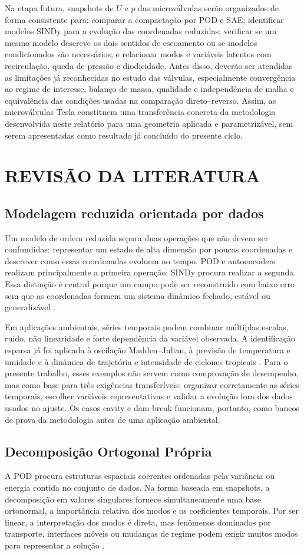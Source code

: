 \documentclass[12pt,a4paper]{article}
\newcommand{\novasecao}[1]{\clearpage\section{#1}}
\begin{document}
Na etapa futura, snapshots de $U$ e $p$ das microválvulas serão organizados de forma consistente para: comparar a compactação por POD e SAE; identificar modelos SINDy para a evolução das coordenadas reduzidas; verificar se um mesmo modelo descreve os dois sentidos de escoamento ou se modelos condicionados são necessários; e relacionar modos e variáveis latentes com recirculação, queda de pressão e diodicidade. Antes disso, deverão ser atendidas as limitações já reconhecidas no estudo das válvulas, especialmente convergência ao regime de interesse, balanço de massa, qualidade e independência de malha e equivalência das condições usadas na comparação direto--reverso. Assim, as microválvulas Tesla constituem uma transferência concreta da metodologia desenvolvida neste relatório para uma geometria aplicada e parametrizável, sem serem apresentadas como resultado já concluído do presente ciclo.

\novasecao{REVISÃO DA LITERATURA}
\subsection{Modelagem reduzida orientada por dados}
Um modelo de ordem reduzida separa duas operações que não devem ser confundidas: representar um estado de alta dimensão por poucas coordenadas e descrever como essas coordenadas evoluem no tempo. POD e autoencoders realizam principalmente a primeira operação; SINDy procura realizar a segunda. Essa distinção é central porque um campo pode ser reconstruído com baixo erro sem que as coordenadas formem um sistema dinâmico fechado, estável ou generalizável \cite{bruntonKutz2019,mendez2023}.

Em aplicações ambientais, séries temporais podem combinar múltiplas escalas, ruído, não linearidade e forte dependência da variável observada. A identificação esparsa já foi aplicada à oscilação Madden--Julian, à previsão de temperatura e umidade e à dinâmica de trajetória e intensidade de ciclones tropicais \cite{diaz2023,regis2023,zhong2024}. Para o presente trabalho, esses exemplos não servem como comprovação de desempenho, mas como base para três exigências transferíveis: organizar corretamente as séries temporais, escolher variáveis representativas e validar a evolução fora dos dados usados no ajuste. Os casos cavity e dam-break funcionam, portanto, como bancos de prova da metodologia antes de uma aplicação ambiental.

\subsection{Decomposição Ortogonal Própria}
A POD procura estruturas espaciais coerentes ordenadas pela variância ou energia contida no conjunto de dados. Na forma baseada em snapshots, a decomposição em valores singulares fornece simultaneamente uma base ortonormal, a importância relativa dos modos e os coeficientes temporais. Por ser linear, a interpretação dos modos é direta, mas fenômenos dominados por transporte, interfaces móveis ou mudanças de regime podem exigir muitos modos para representar a solução \cite{sirovich1987,mendez2023}.
\end{document}
